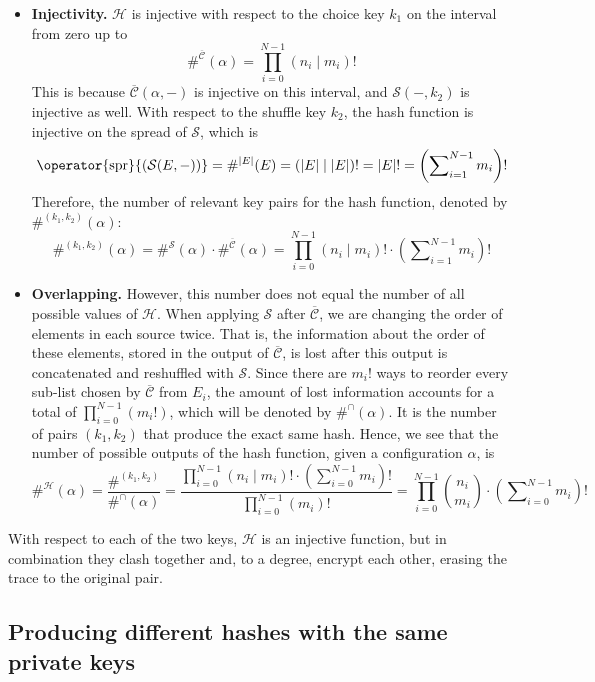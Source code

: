 \documentclass[12pt, a4paper]{article}
\newcommand{\CC}{\overline{\mathcal{C}}}
\renewcommand{\H}{\mathcal{H}}
\renewcommand{\S}{\mathcal{S}}
\newcommand{\spr}[1]{\operator{\mathrm{spr}}{(#1)}}
\begin{document}
\begin{itemize}
    \item \textbf{Injectivity.}
        $ \H $ is injective with respect to the choice key $ k_1 $ on the interval from zero up to
        \[ \#^{\CC}(\alpha) = \prod\limits_{i = 0}^{N-1} (n_i \mid m_i)! \]
        This is because $ \CC(\alpha, -) $ is injective on this interval, and $ \S(-, k_2) $ is injective as well. With respect to the shuffle key $ k_2 $, the hash function is injective on the spread of $ \S $, which is
        \[ \spr{\S(E, -)} = \#^{|E|}(E) = (|E| \mid |E|)! = |E|! = \left( \sum\nolimits_{i = 1}^{N-1} m_i \right)! \]
        Therefore, the number of relevant key pairs for the hash function, denoted by $ \#^{(k_1, k_2)}(\alpha) $:
        \[ \#^{(k_1, k_2)}(\alpha) = \#^{\S}(\alpha) \cdot \#^{\CC}(\alpha) = \prod\limits_{i = 0}^{N-1} (n_i \mid m_i)! \cdot \left( \sum\nolimits_{i = 1}^{N-1} m_i \right)! \]
    \item \textbf{Overlapping.}
        However, this number does not equal the number of all possible values of $ \H $. When applying $ \S $ after $ \CC $, we are changing the order of elements in each source twice. That is, the information about the order of these elements, stored in the output of $ \CC $, is lost after this output is concatenated and reshuffled with $ \S $. Since there are $ m_i! $ ways to reorder every sub-list chosen by $ \CC $ from $ E_i $, the amount of lost information accounts for a total of $ \prod_{i = 0}^{N-1} (m_i!) $, which will be denoted by $ \#^{\cap}(\alpha) $. It is the number of pairs $ (k_1, k_2) $ that produce the exact same hash. Hence, we see that the number of possible outputs of the hash function, given a configuration $ \alpha $, is
        \[ \#^{\H}(\alpha) = \frac{\#^{(k_1,k_2)}}{\#^{\cap}(\alpha)} = \frac{\prod\limits_{i = 0}^{N-1} (n_i \mid m_i)! \cdot \left(\sum\nolimits_{i = 0}^{N-1} m_i\right)!}{\prod\limits_{i = 0}^{N-1} (m_i)!} = \prod\limits_{i = 0}^{N-1} {{n_i}\choose{m_i}} \cdot \left(\sum\nolimits_{i = 0}^{N-1} m_i\right)! \] 
\end{itemize}

With respect to each of the two keys, $ \H $ is an injective function, but in combination they clash together and, to a degree, encrypt each other, erasing the trace to the original pair.

\subsection{Producing different hashes with the same private keys}
\end{document}
